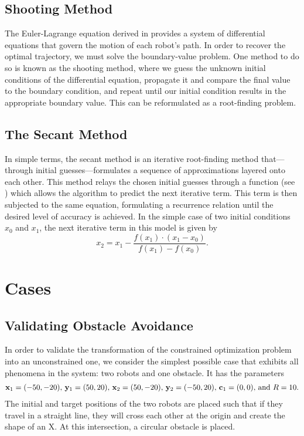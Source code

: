 \documentclass[11pt]{article}
\begin{document}
\subsection{Shooting Method}

The Euler-Lagrange equation derived in  provides a system of differential equations that govern the motion of each robot's path. In order to recover the optimal trajectory, we must solve the boundary-value problem. One method to do so is known as the shooting method, where we guess the unknown initial conditions of the differential equation, propagate it and compare the final value to the boundary condition, and repeat until our initial condition results in the appropriate boundary value. This can be reformulated as a root-finding problem.

\subsection{The Secant Method}

In simple terms, the secant method is an iterative root-finding method that---through initial guesses---formulates a sequence of approximations layered onto each other. This method relays the chosen initial guesses through a function (see ) which allows the algorithm to predict the next iterative term. This term is then subjected to the same equation, formulating a recurrence relation until the desired level of accuracy is achieved. In the simple case of two initial conditions \(x_0\) and \(x_1\), the next iterative term in this model is given by 
\begin{equation}
	x_2 = x_1 - \frac{f(x_1) \cdot (x_1 - x_0)}{f(x_1) - f(x_0)}.
	\label{eq:secant}
\end{equation}

\clearpage

\section{Cases}

\subsection{Validating Obstacle Avoidance}

In order to validate the transformation of the constrained optimization problem into an unconstrained one, we consider the simplest possible case that exhibits all phenomena in the system: two robots and one obstacle. It has the parameters
\begin{align*}
	\mathbf{x}_1 = (-50,-20),\,\mathbf{y}_1 = (50,20),\,\mathbf{x}_2 = (50,-20),\,\mathbf{y}_2 = (-50,20),\,\mathbf{c}_1 = (0,0),\, \text{and } R = 10.
\end{align*}
The initial and target positions of the two robots are placed such that if they travel in a straight line, they will cross each other at the origin and create the shape of an X. At this intersection, a circular obstacle is placed.
\end{document}
